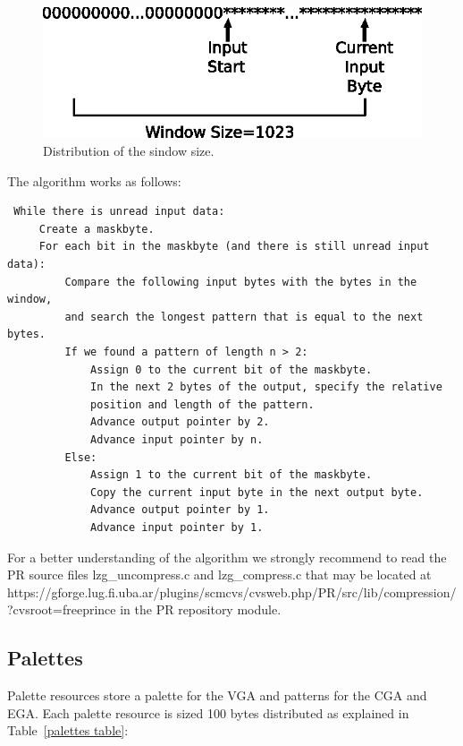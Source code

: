 \documentclass{article}
\begin{document}
\begin{figure}[h]
\centerline{\includegraphics{lzg.eps}}
\caption{Distribution of the sindow size.}
\end{figure}

\pagebreak[2]
 The algorithm works as follows:\\
\begin{verbatim}
 While there is unread input data:
     Create a maskbyte.
     For each bit in the maskbyte (and there is still unread input data):
         Compare the following input bytes with the bytes in the window,
         and search the longest pattern that is equal to the next bytes.
         If we found a pattern of length n > 2:
             Assign 0 to the current bit of the maskbyte.
             In the next 2 bytes of the output, specify the relative
             position and length of the pattern.
             Advance output pointer by 2.
             Advance input pointer by n.
         Else:
             Assign 1 to the current bit of the maskbyte.
             Copy the current input byte in the next output byte.
             Advance output pointer by 1.
             Advance input pointer by 1.
\end{verbatim}
\pagebreak[2]

 For a better understanding of the algorithm we strongly recommend to read
 the PR source files lzg\_uncompress.c and lzg\_compress.c that may be
 located at https://gforge.lug.fi.uba.ar/plugins/scmcvs/cvsweb.php/PR/src/lib/compression/?cvsroot=freeprince
 in the PR repository module.

\subsection{Palettes}
 Palette resources store a palette for the  VGA and patterns for the  CGA and
  EGA. Each palette resource is sized 100 bytes distributed as explained in Table~\ref{palettes table}:
\end{document}
